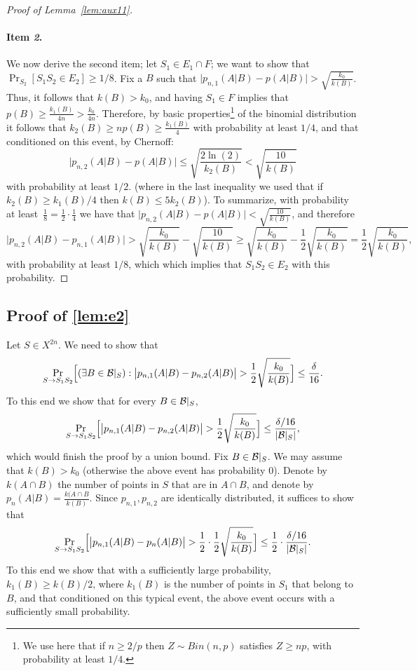 \documentclass{article}
\newcommand{\B}{{\cal B}}
\begin{document}
\begin{proof}[Proof of Lemma~\ref{lem:aux11}]
\paragraph{Item {\it 2}.}
We now derive the second item;
let $S_1\in E_1\cap F$; we want to show that $\Pr_{S_2}[S_1S_2\in E_2]\geq 1/8$.
Fix a $B$ such that $\bigl\lvert p_{n,1}(A\vert B) - p(A\vert B) \bigr\rvert > \sqrt{\frac{k_0}{k(B)}}$.
Thus, it follows that $k(B) > k_0$, and having $S_1\in F$ implies that $p(B)\geq \frac{k_1(B)}{4n} > \frac{k_0}{4n}$.
Therefore, by basic properties\footnote{We use here that if $n\geq 2/p$ then $Z\sim Bin(n,p)$ satisfies $Z\geq np$,
with probability at least $1/4$.} of the binomial distribution it follows that $k_2(B) \geq np(B)\geq \frac{k_1(B)}{4}$ 
with probability at least $1/4$, and that conditioned on this event, by Chernoff:
\[ \bigl\lvert p_{n,2}(A \vert B) - p(A\vert B) \bigr\rvert \leq \sqrt{\frac{2\ln(2)}{k_2(B)}} < \sqrt{\frac{10}{k(B)}} \]
with probability at least $1/2$. 
(where in the last inequality we used that if $k_{2}(B)\geq k_1(B)/4$ then $k(B) \leq 5k_2(B)$).
To summarize, 
with probability at least~$\frac{1}{8}=\frac{1}{2}\cdot\frac{1}{4}$ we have that
$\bigl\lvert p_{n,2}(A \vert B) - p(A\vert B) \bigr\rvert < \sqrt{\frac{10}{k(B)}}$,
and therefore
\[
\bigl\lvert p_{n,2}(A \vert B) - p_{n,1}(A\vert B) \bigr\rvert > 
\sqrt{\frac{k_0}{k(B)}} - \sqrt{\frac{10}{k(B)}}\geq 
\sqrt{\frac{k_0}{k(B)}} - \frac{1}{2}\sqrt{\frac{k_0}{k(B)}}=
\frac{1}{2}\sqrt{\frac{k_0}{k(B)}},
\]
with probability at least $1/8$, which which implies that $S_1S_2\in E_2$ with this probability.
\end{proof}


\subsection{Proof of \ref{lem:e2}}

Let $S\in X^{2n}$. 
We need to show that
\[\Pr_{S\to S_1S_2}\Bigl[(\exists B\in \B|_S) : \bigl\lvert p_{n,1}(A \vert B) - p_{n,2}(A \vert B)  \bigr\rvert > \frac{1}{2}\sqrt{\frac{k_0}{k(B)}} \Bigr] \leq \frac{\delta}{16}.\]
To this end we show that
for every $B\in \B|_S$, 
\[\Pr_{S\to S_1S_2}\Bigl[\bigl\lvert p_{n,1}(A \vert B) - p_{n,2}(A \vert B)  \bigr\rvert > \frac{1}{2}\sqrt{\frac{k_0}{k(B)}} \Bigr] \leq \frac{\delta/16}{\lvert \B|_S\rvert},\]
which would finish the proof by a union bound.
Fix $B\in \B|_S$. 
We may assume that $k(B)> k_0$ (otherwise the above event has probability $0$). 
Denote by $k(A\cap B)$ the number of points in $S$
that are in $A\cap B$, and denote by $p_n(A\vert B) = \frac{k(A\cap B}{k(B)}$.
Since $p_{n,1},p_{n,2}$ are identically distributed, it suffices to show that
\[\Pr_{S\to S_1S_2}\Bigl[\bigl\lvert p_{n,1}(A \vert B) - p_{n}(A \vert B)  \bigr\rvert > \frac{1}{2}\cdot\frac{1}{2}\sqrt{\frac{k_0}{k(B)}} \Bigr] \leq \frac{1}{2}\cdot\frac{\delta/16}{\lvert \B|_S\rvert}.\]
To this end we show that with a sufficiently large probability, 
$k_1(B)\geq k(B)/2$, where $k_1(B)$ is the number of points in $S_1$ that belong to $B$,
and that conditioned on this typical event, the above event occurs with a sufficiently small probability.
\end{document}
